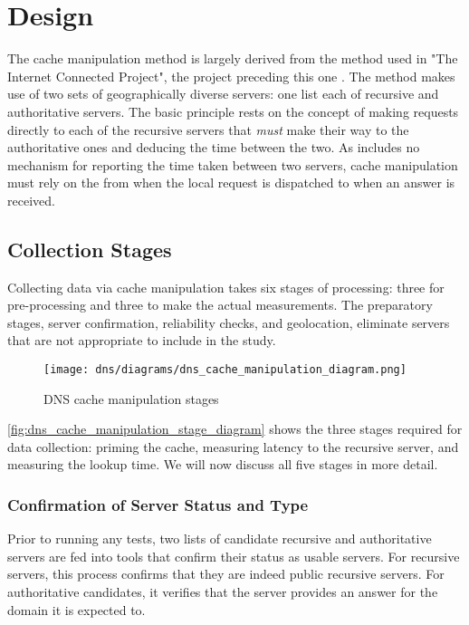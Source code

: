 \section{Design}\label{sec:dns_design}
The \dns cache manipulation method is largely derived from the method used in "The Internet Connected Project", the project preceding this one \cite{Fakult2019}. The method makes use of two sets of geographically diverse \dns servers: one list each of recursive and authoritative servers. The basic principle rests on the concept of making requests directly to each of the recursive servers that \textit{must} make their way to the authoritative ones and deducing the time between the two. As \dns includes no mechanism for reporting the time taken between two servers, \dns cache manipulation must rely on the \rtt from when the local request is dispatched to when an answer is received.

\subsection{Collection Stages}\label{sec:dns_design_collection_stages}

Collecting data via \dns cache manipulation takes six stages of processing: three for pre-processing and three to make the actual measurements. The preparatory stages, server confirmation, reliability checks, and geolocation, eliminate servers that are not appropriate to include in the study.

\begin{figure}[h]
    \centering
    \texttt{[image: dns/diagrams/dns\_cache\_manipulation\_diagram.png]}
    \caption{DNS cache manipulation stages}
    \label{fig:dns_cache_manipulation_stage_diagram}
\end{figure}

\autoref{fig:dns_cache_manipulation_stage_diagram} shows the three stages required for data collection: priming the \dns cache, measuring latency to the recursive \dns server, and measuring the lookup time. We will now discuss all five stages in more detail.

\subsubsection{Confirmation of Server Status and Type}\label{sec:dns_des_server_conf}
Prior to running any tests, two lists of candidate recursive and authoritative servers are fed into tools that confirm their status as usable servers. For recursive servers, this process confirms that they are indeed public recursive servers. For authoritative candidates, it verifies that the server provides an answer for the domain it is expected to.

